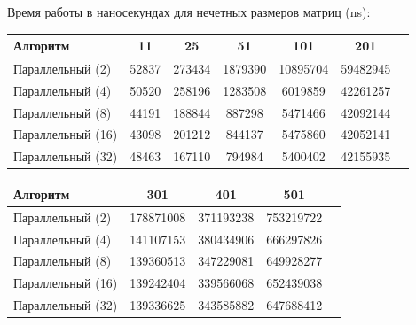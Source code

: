 \documentclass[utf8x, 12pt]{G7-32} %
\begin{document}
Время работы в наносекундах для нечетных размеров матриц (ns):\\
\begin{tabular}{l*{5}{c}r}
	Алгоритм & 11 & 25 & 51 & 101 & 201 \\
	\hline
	Параллельный (2) & 52837 & 273434 & 1879390 & 10895704 & 59482945 \\
	Параллельный (4) & 50520 & 258196 & 1283508 & 6019859 & 42261257 \\
	Параллельный (8) & 44191 & 188844 & 887298 & 5471466 & 42092144 \\
	Параллельный (16) & 43098 & 201212 & 844137 & 5475860 & 42052141 \\
	Параллельный (32) & 48463 & 167110 & 794984 & 5400402 & 42155935 \\
\end{tabular}
\begin{tabular}{l*{3}{c}r}
	Алгоритм & 301 & 401 & 501 \\
	\hline
	Параллельный (2) & 178871008 & 371193238 & 753219722 \\
	Параллельный (4) & 141107153 & 380434906 & 666297826 \\
	Параллельный (8) & 139360513 & 347229081 & 649928277 \\
	Параллельный (16) & 139242404 & 339566068 & 652439038 \\
	Параллельный (32) & 139336625 & 343585882 & 647688412 \\
\end{tabular}

\newpage
\end{document}
